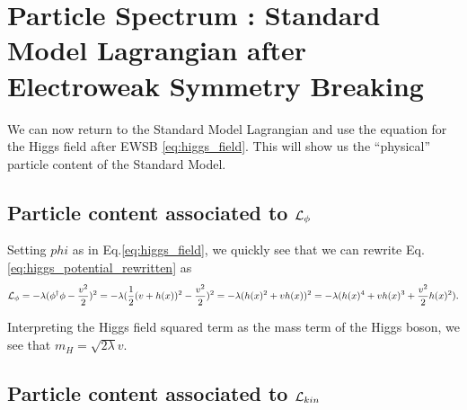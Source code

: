 \section{Particle Spectrum : Standard Model Lagrangian after Electroweak Symmetry Breaking}

We can now return to the Standard Model Lagrangian and use the equation for the Higgs field after EWSB \ref{eq:higgs_field}.
This will show us the ``physical'' particle content of the Standard Model.

\subsection{Particle content associated to $\mathcal{L}_\phi$}

Setting $phi$ as in Eq.\ref{eq:higgs_field}, we quickly see that we can rewrite Eq.\ref{eq:higgs_potential_rewritten} as
\begin{equation}
\mathcal{L}_\phi = - \lambda (\phi^\dagger \phi - \frac{v^2}{2})^2  = - \lambda ( \frac{1}{2} (v + h(x))^2 - \frac{v^2}{2})^2 = - \lambda ( h(x)^2 + vh(x))^2 = -\lambda ( h(x)^4 + v h(x)^3 + \frac{v^2}{2} h(x)^2 ).
\end{equation}

Interpreting the Higgs field squared term as the mass term of the Higgs boson, we see that $m_H = \sqrt{2 \lambda} v$.

\subsection{Particle content associated to $\mathcal{L}_{kin}$}

